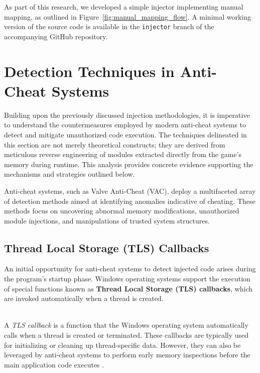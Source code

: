 As part of this research, we developed a simple injector implementing manual mapping, as outlined in Figure~\ref{fig:manual_mapping_flow}. A minimal working version of the source code is available in the \texttt{injector} branch of the accompanying GitHub repository.


\section{Detection Techniques in Anti-Cheat Systems}

Building upon the previously discussed injection methodologies, it is imperative to understand the countermeasures employed by modern anti-cheat systems to detect and mitigate unauthorized code execution. The techniques delineated in this section are not merely theoretical constructs; they are derived from meticulous reverse engineering of modules extracted directly from the game's memory during runtime. This analysis provides concrete evidence supporting the mechanisms and strategies outlined below.

Anti-cheat systems, such as Valve Anti-Cheat (VAC), deploy a multifaceted array of detection methods aimed at identifying anomalies indicative of cheating. These methods focus on uncovering abnormal memory modifications, unauthorized module injections, and manipulations of trusted system structures.

\subsection*{Thread Local Storage (TLS) Callbacks}

An initial opportunity for anti-cheat systems to detect injected code arises during the program's startup phase. Windows operating systems support the execution of special functions known as \textbf{Thread Local Storage (TLS) callbacks}, which are invoked automatically when a thread is created.

\begin{tcolorbox}[colback=gray!10, colframe=gray!50, boxrule=0pt, sharp corners, width=\linewidth, left=1mm, right=1mm, top=0.5mm, bottom=0.5mm]
 \\
A \textit{TLS callback} is a function that the Windows operating system automatically calls when a thread is created or terminated. These callbacks are typically used for initializing or cleaning up thread-specific data. However, they can also be leveraged by anti-cheat systems to perform early memory inspections before the main application code executes \parencite{mitre2025tls}.
\end{tcolorbox}

